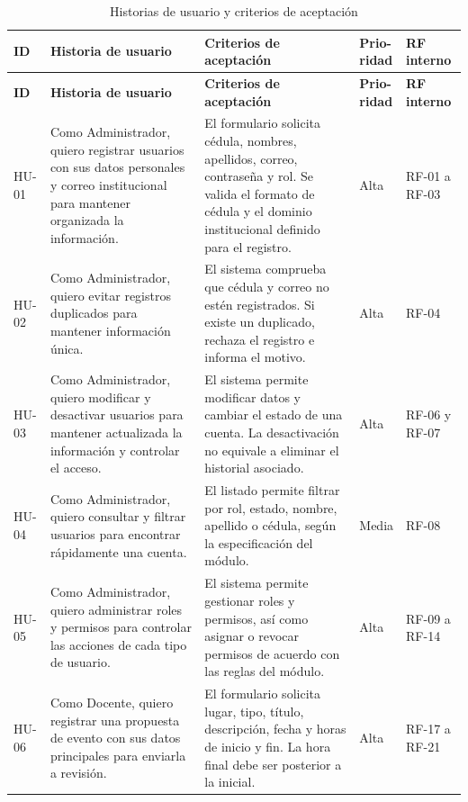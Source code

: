 \begin{longtable}{P{0.08\textwidth} P{0.30\textwidth} P{0.32\textwidth} P{0.08\textwidth} P{0.12\textwidth}}
\caption{Historias de usuario y criterios de aceptación}\\
\toprule
\textbf{ID} & \textbf{Historia de usuario} & \textbf{Criterios de aceptación} & \textbf{Prio-\newline ridad} & \textbf{RF interno}\\
\midrule
\endfirsthead
\toprule
\textbf{ID} & \textbf{Historia de usuario} & \textbf{Criterios de aceptación} & \textbf{Prio-\newline ridad} & \textbf{RF interno}\\
\midrule
\endhead
HU-01 & Como Administrador, quiero registrar usuarios con sus datos personales y correo institucional para mantener organizada la información. & El formulario solicita cédula, nombres, apellidos, correo, contraseña y rol. Se valida el formato de cédula y el dominio institucional definido para el registro. & Alta & RF-01 a RF-03\\
HU-02 & Como Administrador, quiero evitar registros duplicados para mantener información única. & El sistema comprueba que cédula y correo no estén registrados. Si existe un duplicado, rechaza el registro e informa el motivo. & Alta & RF-04\\
HU-03 & Como Administrador, quiero modificar y desactivar usuarios para mantener actualizada la información y controlar el acceso. & El sistema permite modificar datos y cambiar el estado de una cuenta. La desactivación no equivale a eliminar el historial asociado. & Alta & RF-06 y RF-07\\
HU-04 & Como Administrador, quiero consultar y filtrar usuarios para encontrar rápidamente una cuenta. & El listado permite filtrar por rol, estado, nombre, apellido o cédula, según la especificación del módulo. & Media & RF-08\\
HU-05 & Como Administrador, quiero administrar roles y permisos para controlar las acciones de cada tipo de usuario. & El sistema permite gestionar roles y permisos, así como asignar o revocar permisos de acuerdo con las reglas del módulo. & Alta & RF-09 a RF-14\\
HU-06 & Como Docente, quiero registrar una propuesta de evento con sus datos principales para enviarla a revisión. & El formulario solicita lugar, tipo, título, descripción, fecha y horas de inicio y fin. La hora final debe ser posterior a la inicial. & Alta & RF-17 a RF-21\\

\end{longtable}
